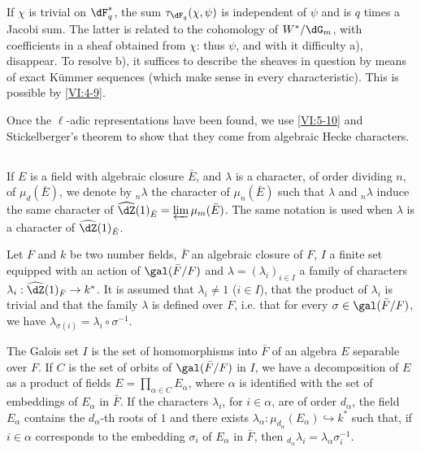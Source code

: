 If $\chi$ is trivial on $\dF_q^\ast$, the sum $\tau_{\dF_q}(\chi,\psi)$ 
is independent of $\psi$ and is $q$ times a Jacobi sum. The latter is 
related to the cohomology of $W^\ast/\dG_m$, with coefficients in a sheaf 
obtained from $\chi$: thus $\psi$, and with it difficulty a), disappear. To 
resolve b), it suffices to describe the sheaves in question by means of 
exact K\"ummer sequences (which make sense in every characteristic). This is 
possible by \ref{VI:4-9}. 

Once the $\ell$-adic representations have been found, we use 
\ref{VI:5-10} and Stickelberger's theorem to show that they 
come from algebraic Hecke characters. 





\subsection{}\label{VI:6-1}

If $E$ is a field with algebraic closure $\bar E$, and $\lambda$ is 
a character, of order dividing $n$, of $\mu_d(\bar E)$, we denote by $_n\lambda$ the 
character of $\mu_n(\bar E)$ such that $\lambda$ and $_n \lambda$ induce the 
same character of $\widehat\dZ(1)_{\bar E} = \varprojlim \mu_m(\bar E)$. The 
same notation is used when $\lambda$ is a character of $\widehat\dZ(1)_{\bar E}$.

Let $F$ and $k$ be two number fields, $\bar F$ an algebraic closure of 
$F$, $I$ a finite set equipped with an action of $\gal(\bar F/F)$ and 
$\lambda=(\lambda_i)_{i\in I}$ a family of characters 
$\lambda_i:\widehat\dZ(1)_{\bar F} \to k^\ast$. It is assumed that 
$\lambda_i\ne 1$ ($i\in I$), that 
the product of $\lambda_i$ is trivial and that 
the family $\lambda$ is defined over $F$, i.e. that for every 
$\sigma\in \gal(\bar F/F)$, we have 
$\lambda_{\sigma(i)}=\lambda_i\circ \sigma^{-1}$. 

The Galois set $I$ is the set of homomorphisms into $\bar F$ of an 
algebra $E$ separable over $F$. If $C$ is the set of orbits of 
$\gal(\bar F/F)$ in $I$, we have a decomposition of $E$ as a product of fields 
$E=\prod_{\alpha\in C} E_\alpha$, where $\alpha$ is identified with the set of 
embeddings of $E_\alpha$ in $\bar F$. If the characters $\lambda_i$, for 
$i\in \alpha$, are of order $d_\alpha$, the field $E_\alpha$ contains the 
$d_\alpha$-th roots of $1$ and there exists 
$\lambda_\alpha:\mu_{d_\alpha}(E_\alpha) \hookrightarrow k^\ast$ such that, if 
$i\in \alpha$ corresponds to the embedding $\sigma_i$ of $E_\alpha$ in $\bar F$, 
then $_{d_\alpha} \lambda_i = \lambda_\alpha \sigma_i^{-1}$. 





